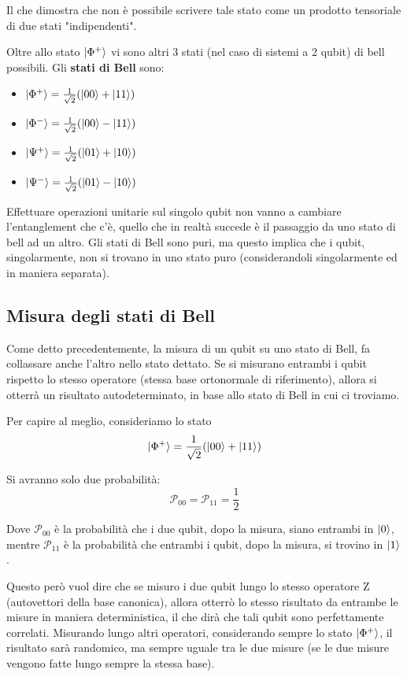 Il che dimostra che non è possibile scrivere tale stato come un prodotto tensoriale di due stati "indipendenti". 

Oltre allo stato \(\ket{\Phi^+}\) vi sono altri 3 stati (nel caso di sistemi a 2 qubit) di bell possibili. Gli \textbf{stati di Bell} sono:
\begin{itemize}
    \item \(\ket{\Phi^+} = \frac{1}{\sqrt{2}}(\ket{00} + \ket{11})\)
    \item \(\ket{\Phi^-} = \frac{1}{\sqrt{2}}(\ket{00}-\ket{11})\)
    \item \(\ket{\Psi^+} = \frac{1}{\sqrt{2}}(\ket{01}+\ket{10})\)
    \item \(\ket{\Psi^-} = \frac{1}{\sqrt{2}}(\ket{01}-\ket{10})\)
\end{itemize}

Effettuare operazioni unitarie sul singolo qubit non vanno a cambiare l'entanglement che c'è, quello che in realtà succede è il passaggio da uno stato di bell ad un altro. Gli stati di Bell sono puri, ma questo implica che i qubit, singolarmente, non si trovano in uno stato puro (considerandoli singolarmente ed in maniera separata). 


\subsection{Misura degli stati di Bell}
Come detto precedentemente, la misura di un qubit su uno stato di Bell, fa collassare anche l'altro nello stato dettato. Se si misurano entrambi i qubit rispetto lo stesso operatore (stessa base ortonormale di riferimento), allora si otterrà un risultato autodeterminato, in base allo stato di Bell in cui ci troviamo. 

Per capire al meglio, consideriamo lo stato
\[
\ket{\Phi^+} = \frac{1}{\sqrt{2}}(\ket{00} + \ket{11})
\]

Si avranno solo due probabilità:
\[
\mathcal{P}_{00} = \mathcal{P}_{11} = \frac{1}{2}
\]

Dove \(\mathcal{P}_{00}\) è la probabilità che i due qubit, dopo la misura, siano entrambi in \(\ket{0}\), mentre \(\mathcal{P}_{11}\) è la probabilità che entrambi i qubit, dopo la misura, si trovino in \(\ket{1}\).

Questo però vuol dire che se misuro i due qubit lungo lo stesso operatore Z (autovettori della base canonica), allora otterrò lo stesso risultato da entrambe le misure in maniera deterministica, il che dirà che tali qubit sono perfettamente correlati. Misurando lungo altri operatori, considerando sempre lo stato \(\ket{\Phi^+}\), il risultato sarà randomico, ma sempre uguale tra le due misure (se le due misure vengono fatte lungo sempre la stessa base). 

